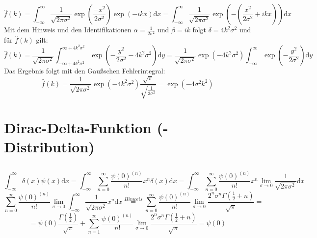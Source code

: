 \documentclass[a4paper,11pt]{article}
\begin{document}
\subsection{}
\begin{equation}
        \hat{f}(k) = \int_{-\infty}^\infty \frac{1}{\sqrt{2\pi\sigma^2}}\exp(\frac{-x^2}{2\sigma^2}) \exp(-ikx)\text{d}x = \int_{-\infty}^\infty \frac{1}{\sqrt{2\pi\sigma^2}}\exp(-(\frac{x^2}{2\sigma^2} + ikx))\text{d}x
\end{equation}
Mit dem Hinweis und den Identifikationen $\alpha = \frac{1}{2\sigma^2}$ und $\beta = ik$ folgt $\delta = 4k^2\sigma^2$ und für $\hat{f}(k)$ gilt:
\begin{equation}
        \hat{f}(k) = \frac{1}{\sqrt{2\pi\sigma^2}}\int_{-\infty + 4k^2\sigma^2}^{\infty + 4k^2\sigma^2} \exp(-\frac{y^2}{2\sigma^2} - 4k^2\sigma^2)\text{d}y = \frac{1}{\sqrt{2\pi\sigma^2}}\exp(-4k^2\sigma^2)\int_{-\infty}^{\infty} \exp(-\frac{y^2}{2\sigma^2})\text{d}y
\end{equation}
Das Ergebnis folgt mit den Gaußschen Fehlerintegral:
\begin{equation}
        \hat{f}(k) = \frac{1}{\sqrt{2\pi\sigma^2}}\exp(-4k^2\sigma^2) \frac{\sqrt{\pi}}{\sqrt{\frac{1}{2\sigma^2}}} = \exp(-4\sigma^2k^2)
\end{equation}
\section{Dirac-Delta-Funktion (-Distribution)}

\subsection{}

\subsection{}
\begin{equation}
        \int_{-\infty}^\infty \delta(x) \psi(x)\text{d}x = \int_{-\infty}^\infty \sum_{n=0}^\infty \frac{\psi(0)^{(n)}}{n!} x^n \delta(x)\text{d}x = \int_{-\infty}^\infty \sum_{n=0}^\infty \frac{\psi(0)^{(n)}}{n!} x^n \lim_{\sigma \to 0}\frac{1}{\sqrt{2\pi\sigma^2}}\text{d}x
\end{equation}
\begin{equation}
        \sum_{n=0}^\infty \frac{\psi(0)^{(n)}}{n!} \lim_{\sigma \to 0} \int_{-\infty}^\infty \frac{1}{\sqrt{2\pi\sigma^2}} x^n \text{d}x \overset{Hinweis}{=} \sum_{n=0}^\infty \frac{\psi(0)^{(n)}}{n!} \lim_{\sigma \to 0} \frac{2^n\sigma^n\Gamma(\frac{1}{2} + n)}{\sqrt{\pi}} = 
\end{equation}
\begin{equation}
        = \psi(0) \frac{\Gamma(\frac{1}{2})}{\sqrt{\pi}} + \sum_{n=1}^\infty \frac{\psi(0)^{(n)}}{n!} \lim_{\sigma \to 0} \frac{2^n\sigma^n\Gamma(\frac{1}{2} + n)}{\sqrt{\pi}} = \psi(0)
\end{equation}
\end{document}
